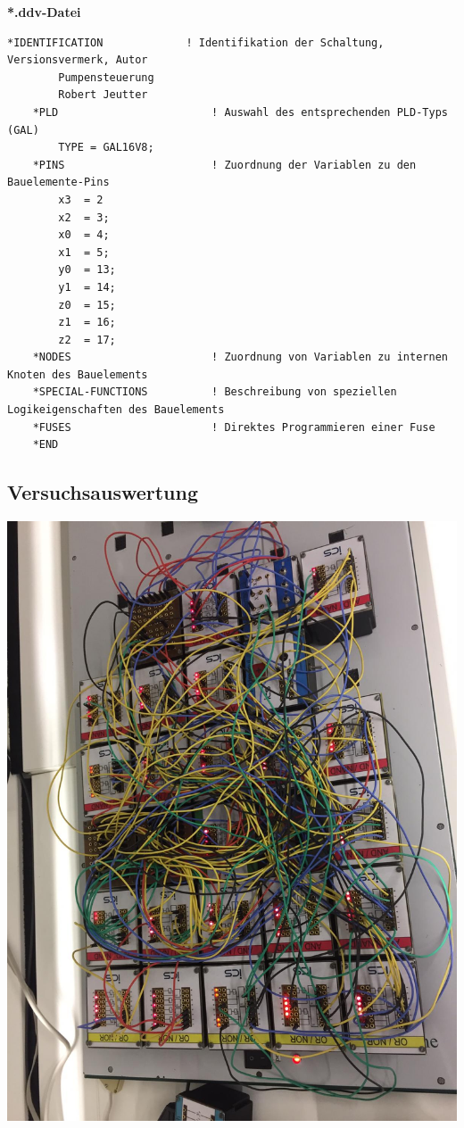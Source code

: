 \documentclass[a4paper,12pt,titlepage]{scrartcl}
\begin{document}
\textbf{*.ddv-Datei}
\begin{lstlisting}[name=*.ddv-Datei, basicstyle=\tiny]
    *IDENTIFICATION             ! Identifikation der Schaltung, Versionsvermerk, Autor
        Pumpensteuerung
        Robert Jeutter
    *PLD                        ! Auswahl des entsprechenden PLD-Typs (GAL)
        TYPE = GAL16V8;
    *PINS                       ! Zuordnung der Variablen zu den Bauelemente-Pins
        x3  = 2
        x2  = 3;
        x0  = 4;
        x1  = 5;
        y0  = 13;
        y1  = 14;
        z0  = 15;
        z1  = 16;
        z2  = 17;
    *NODES                      ! Zuordnung von Variablen zu internen Knoten des Bauelements
    *SPECIAL-FUNCTIONS          ! Beschreibung von speziellen Logikeigenschaften des Bauelements
    *FUSES                      ! Direktes Programmieren einer Fuse
    *END
    \end{lstlisting}

\subsection*{Versuchsauswertung}
\begin{center}
    \includegraphics[width=.8\linewidth]{Assets/PraktikumSchaltsysteme.jpeg}
\end{center}
\end{document}
